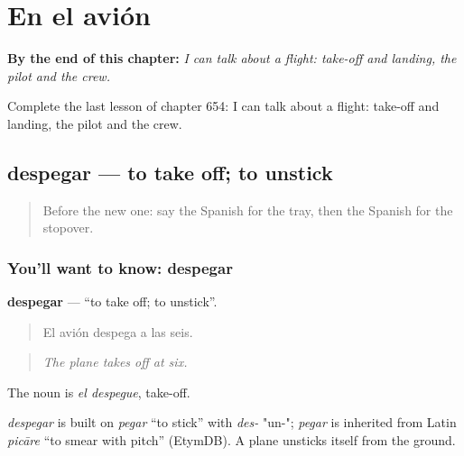 
\chapter{En el avión}
\label{ch:es-en-el-avion}

\begin{chapteropening}
\textbf{By the end of this chapter:} \emph{I can talk about a flight: take-off and landing, the pilot and the crew.}

Complete the last lesson of chapter 654: I can talk about a flight: take-off and landing, the pilot and the crew.
\end{chapteropening}

\section[despegar]{despegar — to take off; to unstick}

\label{lesson:ES-C654-despegar}



\begin{quote}
Before the new one: say the Spanish for the tray, then the Spanish for the stopover.
\end{quote}

\subsection*{You'll want to know: despegar}
\textbf{despegar} — \textquotedblleft{}to take off; to unstick\textquotedblright{}.

\begin{quote}
El avión despega a las seis.
\end{quote}

\begin{quote}
\emph{The plane takes off at six.}
\end{quote}

The noun is \emph{el despegue}, take-off.

\begin{cousinweb}
\emph{despegar} is built on \emph{pegar} \textquotedblleft{}to stick\textquotedblright{} with \emph{des-} "un-"; \emph{pegar} is inherited from Latin \emph{picāre} \textquotedblleft{}to smear with pitch\textquotedblright{} (EtymDB). A plane unsticks itself from the ground.
\end{cousinweb}

